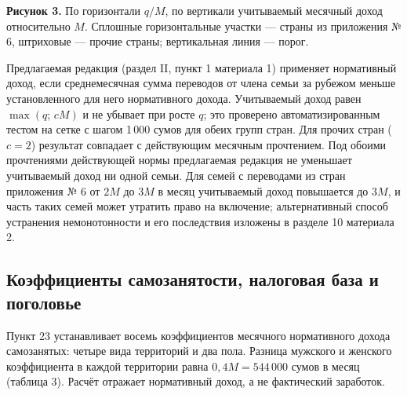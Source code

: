 \documentclass[12pt,a4paper]{extarticle}
\begin{document}
\begin{center}\end{center}
\textbf{Рисунок 3.} По горизонтали $q/M$, по вертикали учитываемый месячный доход относительно $M$. Сплошные горизонтальные участки — страны из приложения № 6, штриховые — прочие страны; вертикальная линия — порог.

Предлагаемая редакция (раздел II, пункт 1 материала 1) применяет нормативный доход, если среднемесячная сумма переводов от члена семьи за рубежом меньше установленного для него нормативного дохода. Учитываемый доход равен $\max(q;\,cM)$ и не убывает при росте $q$; это проверено автоматизированным тестом на сетке с шагом 1\,000 сумов для обеих групп стран. Для прочих стран ($c=2$) результат совпадает с действующим месячным прочтением. Под обоими прочтениями действующей нормы предлагаемая редакция не уменьшает учитываемый доход ни одной семьи. Для семей с переводами из стран приложения № 6 от $2M$ до $3M$ в месяц учитываемый доход повышается до $3M$, и часть таких семей может утратить право на включение; альтернативный способ устранения немонотонности и его последствия изложены в разделе 10 материала 2.

\subsection{Коэффициенты самозанятости, налоговая база и поголовье}
Пункт 23 устанавливает восемь коэффициентов месячного нормативного дохода самозанятых: четыре вида территорий и два пола. Разница мужского и женского коэффициента в каждой территории равна $0{,}4M=544\,000$ сумов в месяц (таблица 3). Расчёт отражает нормативный доход, а не фактический заработок.
\end{document}
